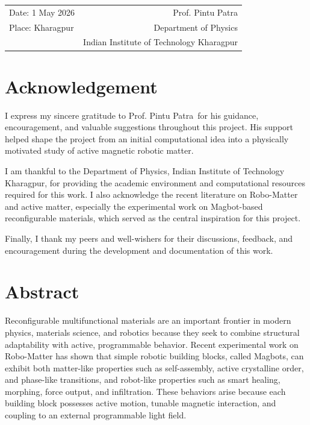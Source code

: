 \documentclass[12pt,a4paper,oneside]{report}
\newcommand{\supervisor}{Prof. Pintu Patra}
\newcommand{\department}{Department of Physics}
\newcommand{\institute}{Indian Institute of Technology Kharagpur}
\newcommand{\submissiondate}{1 May 2026}
\begin{document}
\vspace{1.8cm}
\begin{tabularx}{\textwidth}{@{}X r@{}}
Date: \submissiondate & \supervisor \\
Place: Kharagpur & \department \\
 & \institute
\end{tabularx}

\clearpage

\chapter*{Acknowledgement}
I express my sincere gratitude to \supervisor\ for his guidance, encouragement, and valuable suggestions throughout this project. His support helped shape the project from an initial computational idea into a physically motivated study of active magnetic robotic matter.

I am thankful to the \department, \institute, for providing the academic environment and computational resources required for this work. I also acknowledge the recent literature on Robo-Matter and active matter, especially the experimental work on Magbot-based reconfigurable materials, which served as the central inspiration for this project.

Finally, I thank my peers and well-wishers for their discussions, feedback, and encouragement during the development and documentation of this work.

\clearpage

\chapter*{Abstract}
Reconfigurable multifunctional materials are an important frontier in modern physics, materials science, and robotics because they seek to combine structural adaptability with active, programmable behavior. Recent experimental work on Robo-Matter has shown that simple robotic building blocks, called Magbots, can exhibit both matter-like properties such as self-assembly, active crystalline order, and phase-like transitions, and robot-like properties such as smart healing, morphing, force output, and infiltration. These behaviors arise because each building block possesses active motion, tunable magnetic interaction, and coupling to an external programmable light field.
\end{document}
